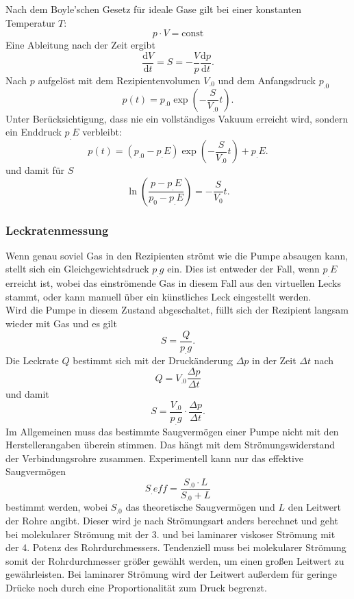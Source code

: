 Nach dem Boyle'schen Gesetz für ideale Gase gilt bei einer konstanten Temperatur $T$:
\begin{equation}
p\cdot V =\text{const}\label{eq:Boyle}
\end{equation}
Eine Ableitung nach der Zeit ergibt
\[
\frac{\mathrm{d}V}{\mathrm{d}t} = S = - \frac{V}{p} \frac{\mathrm{d}p}{\mathrm{d}t}\text{.}
\]
Nach $p$ aufgelöst mit dem Rezipientenvolumen $V_.0$ und dem Anfangsdruck $p_.0$
\begin{equation}
p(t)=p_.0\exp{\left(-\frac{S}{V_.0}t\right)}\label{eq:pt1}\text{.}
\end{equation}
Unter Berücksichtigung, dass nie ein vollständiges Vakuum erreicht wird, sondern ein Enddruck $p_.E$ verbleibt:
\begin{equation}
p(t)=(p_.0-p_.E)\exp{\left(-\frac{S}{V_.0}t\right)}+p_.E\text{.}\label{eq:pt2}
\end{equation}
und damit für $S$
\begin{equation}
\ln\left(\frac{p-p_.E}{p_0-p_.E}\right) = -\frac{S}{V_0}t\text{.}\label{eq:S2}
\end{equation}

\subsubsection{Leckratenmessung}

Wenn genau soviel Gas in den Rezipienten strömt wie die Pumpe absaugen kann, stellt sich ein Gleichgewichtsdruck $p_.g$ ein. Dies ist entweder der Fall, wenn $p_.E$ erreicht ist, wobei das einströmende Gas in diesem Fall aus den virtuellen Lecks stammt, oder kann manuell über ein künstliches Leck eingestellt werden. \\
Wird die Pumpe in diesem Zustand abgeschaltet, füllt sich der Rezipient langsam wieder mit Gas und es gilt 
\[
S=\frac{Q}{p_.g}\text{.}
\]
Die Leckrate $Q$ bestimmt sich mit der Druckänderung $\Delta p$ in der Zeit $\Delta t$ nach
\[
Q=V_.0\frac{\Delta p}{\Delta t}
\]
und damit
\begin{equation}
S=\frac{V_.0}{p_.g}\cdot\frac{\Delta p}{\Delta t}\text{.}\label{eq:S}
\end{equation}
\newline\newline
Im Allgemeinen muss das bestimmte Saugvermögen einer Pumpe nicht mit den Herstellerangaben überein stimmen.
Das hängt mit dem Strömungswiderstand der Verbindungsrohre zusammen.
Experimentell kann nur das effektive Saugvermögen
\begin{equation}
S_.{eff}=\frac{S_.0\cdot L}{S_.0+L}
\end{equation}
bestimmt werden, wobei $S_.0$ das theoretische Saugvermögen und $L$ den Leitwert der Rohre angibt.
Dieser wird je nach Strömungsart anders berechnet und geht bei molekularer Strömung mit der 3. und bei laminarer viskoser Strömung mit der 4. Potenz des Rohrdurchmessers\cite{V70}.
Tendenziell muss bei molekularer Strömung somit der Rohrdurchmesser größer gewählt werden, um einen großen Leitwert zu gewährleisten.
Bei laminarer Strömung wird der Leitwert außerdem für geringe Drücke noch durch eine Proportionalität zum Druck begrenzt.

